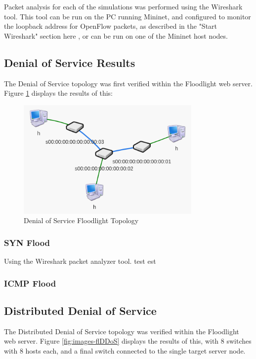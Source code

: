 Packet analysis for each of the simulations was performed using the Wireshark
tool. This tool can be run on the PC running Mininet, and configured to monitor
the loopback address for OpenFlow packets, as described in the "Start Wireshark"
section here \cite{mininetWS}, or can be run on one of the Mininet host nodes.

\subsection{Denial of Service Results}

The Denial of Service topology was first verified within the Floodlight web
server. Figure \ref{fig:images-flDoS} displays the results of this:

\begin{figure}[H]
	\centering
	\includegraphics[width=0.8\textwidth]{images/flDoS}
	\caption{Denial of Service Floodlight Topology}
	\label{fig:images-flDoS}
\end{figure}

\subsubsection{SYN Flood}

Using the Wireshark packet analyzer tool. test est

\subsubsection{ICMP Flood}

\subsection{Distributed Denial of Service}

The Distributed Denial of Service topology was verified within the Floodlight
web server. Figure \ref{fig:images-flDDoS} displays the results of this, with
8 switches with 8 hosts each, and a final switch connected to the single target
server node.

